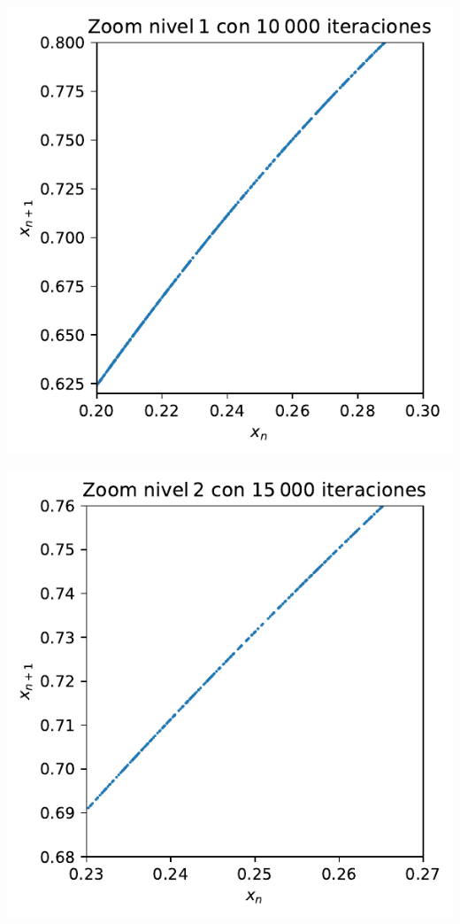 \documentclass[
  10pt,
  a4paper,
  DIV=11,
  numbers=noendperiod,
  open=any]{scrreprt}
\makeatletter
\newcommand*\pandocbounded[1]{%
  \sbox\pandoc@box{#1}%
  \Gscale@div\@tempa{\textheight}{\dimexpr\ht\pandoc@box+\dp\pandoc@box\relax}%
  \Gscale@div\@tempb{\linewidth}{\wd\pandoc@box}%
  \ifdim\@tempb\p@<\@tempa\p@\let\@tempa\@tempb\fi%
  \ifdim\@tempa\p@<\p@\scalebox{\@tempa}{\usebox\pandoc@box}%
  \else\usebox{\pandoc@box}%
  \fi%
}
\numberwithin{equation}{chapter}
\numberwithin{equation}{section}
\renewcommand{\[}{\begin{equation}}
\renewcommand{\]}{\end{equation}}
\providecommand{\pandocbounded}[1]{#1}%
\renewcommand{\pandocbounded}[1]{\begingroup\centering #1\par\endgroup}
\makeatother
\begin{document}
\pandocbounded{\includegraphics[keepaspectratio]{04-clima/atractor_files/figure-pdf/cell-6-output-2.pdf}}

\pandocbounded{\includegraphics[keepaspectratio]{04-clima/atractor_files/figure-pdf/cell-6-output-3.pdf}}
\end{document}
